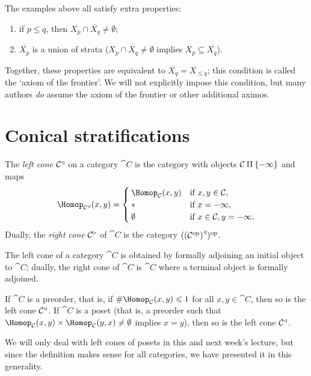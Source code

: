 \begin{rmk}
The examples above all satisfy extra properties:
\begin{enumerate}
\item if \(p\leq q\), then \(X_p\cap\overline{X_q}\neq\emptyset\);
\item \(\overline{X_p}\) is a union of strata (\(X_p\cap\overline{X_q}\neq\emptyset\) implies \(X_p\subseteq\overline{X_q}\)).
\end{enumerate}
Together, these properties are equivalent to \(\overline{X_q}=X_{\leq q}\); this condition is called the `axiom of the frontier'.
We will not explicitly impose this condition, but many authors \emph{do} assume the axiom of the frontier or other additional aximos.
\end{rmk}


\section{Conical stratifications}
\begin{defn}
The \emph{left cone} \({\mathcal{C}}^{\triangleleft}\) on a category \(\cat C\) is the category with objects \(\mathcal{C}\amalg\{-\infty\}\) and maps
\[ \Hom[\leftcone{\cat C}](x,y) =
  \begin{cases}
    \Hom[\cat C](x,y) & \text{if } x,y\in\cat C\text{,} \\
    \terminal & \text{if } x = -\infty\text{,} \\
    \emptyset & \text{if } x\in\cat C, y = -\infty\text{.}
  \end{cases}
\]
Dually, the \emph{right cone} \({\mathcal{C}}^{\triangleright}\) of \(\cat C\) is the category \(({(\mathcal{C}^{\mathrm{op}})}^{\triangleleft})^{\mathrm{op}}\).
\end{defn}

The left cone of a category \(\cat C\) is obtained by formally adjoining an initial object to \(\cat C\); dually, the right cone of \(\cat C\) is \(\cat C\) where a terminal object is formally adjoined.

\begin{rmk}
If \(\cat C\) is a preorder, that is, if \(\#\Hom[\cat C](x,y)\leq 1\) for all \(x,y\in\cat C\), then so is the left cone \({\mathcal{C}}^{\triangleleft}\).
If \(\cat C\) is a poset (that is, a preorder such that \(\Hom[\cat C](x,y)\times\Hom[\cat C](y,x)\neq\emptyset\) implies \(x=y\)), then so is the left cone \({\mathcal{C}}^{\triangleleft}\).
\end{rmk}

We will only deal with left cones of posets in this and next week's lecture, but since the definition makes sense for all categories, we have presented it in this generality.

